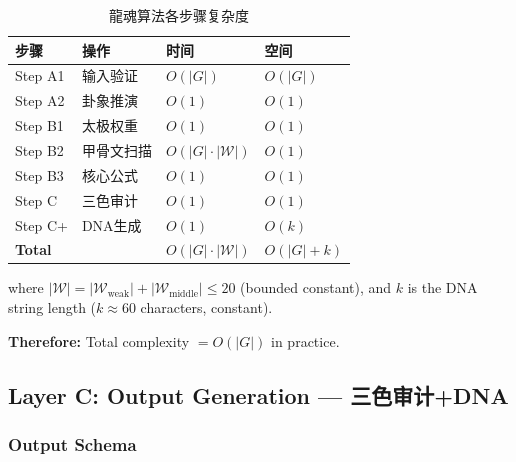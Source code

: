 \documentclass[conference]{IEEEtran}
\begin{document}
\begin{table}[H]
\centering
\caption{龍魂算法各步骤复杂度}
\label{tab:complexity}
\renewcommand{\arraystretch}{1.2}
\begin{tabular}{llll}
\toprule
\textbf{步骤} & \textbf{操作}
  & \textbf{时间} & \textbf{空间} \\
\midrule
Step A1 & 输入验证 & $O(|G|)$ & $O(|G|)$ \\
Step A2 & 卦象推演 & $O(1)$ & $O(1)$ \\
Step B1 & 太极权重 & $O(1)$ & $O(1)$ \\
Step B2 & 甲骨文扫描 & $O(|G|\cdot|\mathcal{W}|)$ & $O(1)$ \\
Step B3 & 核心公式 & $O(1)$ & $O(1)$ \\
Step C  & 三色审计 & $O(1)$ & $O(1)$ \\
Step C+ & DNA生成 & $O(1)$ & $O(k)$ \\
\midrule
\textbf{Total} & & $O(|G|\cdot|\mathcal{W}|)$ & $O(|G|+k)$ \\
\bottomrule
\end{tabular}
\end{table}

\noindent where $|\mathcal{W}| = |\mathcal{W}_{\text{weak}}|
+ |\mathcal{W}_{\text{middle}}| \leq 20$
(bounded constant), and $k$ is the DNA string length
($k \approx 60$ characters, constant).

\textbf{Therefore:} Total complexity
$= O(|G|)$ in practice.

\subsection{Layer C: Output Generation — 三色审计+DNA}
\label{ssec:output}

\subsubsection{Output Schema}
\end{document}
